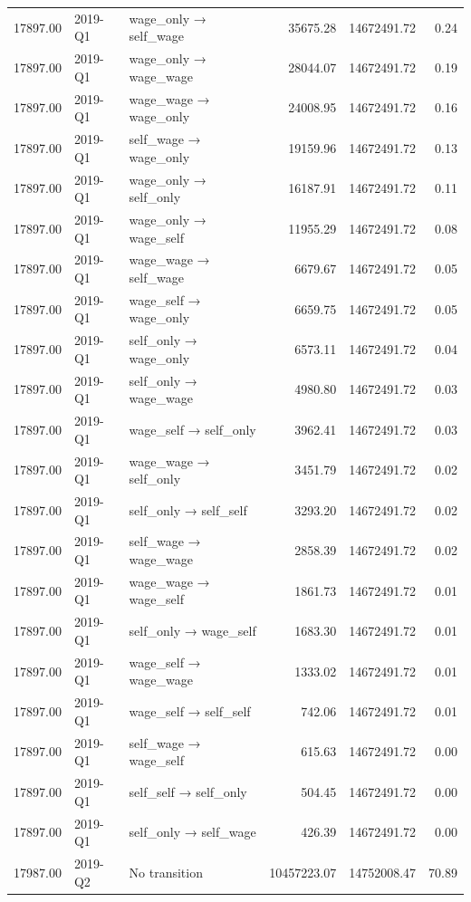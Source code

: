 \begin{table}[ht]
{\begin{tabular}{rllrrr}
  17897.00 & 2019-Q1 & wage\_only → self\_wage & 35675.28 & 14672491.72 & 0.24 \\ 
  17897.00 & 2019-Q1 & wage\_only → wage\_wage & 28044.07 & 14672491.72 & 0.19 \\ 
  17897.00 & 2019-Q1 & wage\_wage → wage\_only & 24008.95 & 14672491.72 & 0.16 \\ 
  17897.00 & 2019-Q1 & self\_wage → wage\_only & 19159.96 & 14672491.72 & 0.13 \\ 
  17897.00 & 2019-Q1 & wage\_only → self\_only & 16187.91 & 14672491.72 & 0.11 \\ 
  17897.00 & 2019-Q1 & wage\_only → wage\_self & 11955.29 & 14672491.72 & 0.08 \\ 
  17897.00 & 2019-Q1 & wage\_wage → self\_wage & 6679.67 & 14672491.72 & 0.05 \\ 
  17897.00 & 2019-Q1 & wage\_self → wage\_only & 6659.75 & 14672491.72 & 0.05 \\ 
  17897.00 & 2019-Q1 & self\_only → wage\_only & 6573.11 & 14672491.72 & 0.04 \\ 
  17897.00 & 2019-Q1 & self\_only → wage\_wage & 4980.80 & 14672491.72 & 0.03 \\ 
  17897.00 & 2019-Q1 & wage\_self → self\_only & 3962.41 & 14672491.72 & 0.03 \\ 
  17897.00 & 2019-Q1 & wage\_wage → self\_only & 3451.79 & 14672491.72 & 0.02 \\ 
  17897.00 & 2019-Q1 & self\_only → self\_self & 3293.20 & 14672491.72 & 0.02 \\ 
  17897.00 & 2019-Q1 & self\_wage → wage\_wage & 2858.39 & 14672491.72 & 0.02 \\ 
  17897.00 & 2019-Q1 & wage\_wage → wage\_self & 1861.73 & 14672491.72 & 0.01 \\ 
  17897.00 & 2019-Q1 & self\_only → wage\_self & 1683.30 & 14672491.72 & 0.01 \\ 
  17897.00 & 2019-Q1 & wage\_self → wage\_wage & 1333.02 & 14672491.72 & 0.01 \\ 
  17897.00 & 2019-Q1 & wage\_self → self\_self & 742.06 & 14672491.72 & 0.01 \\ 
  17897.00 & 2019-Q1 & self\_wage → wage\_self & 615.63 & 14672491.72 & 0.00 \\ 
  17897.00 & 2019-Q1 & self\_self → self\_only & 504.45 & 14672491.72 & 0.00 \\ 
  17897.00 & 2019-Q1 & self\_only → self\_wage & 426.39 & 14672491.72 & 0.00 \\ 
  17987.00 & 2019-Q2 & No transition & 10457223.07 & 14752008.47 & 70.89 \\ 

\end{tabular}}
\end{table}
